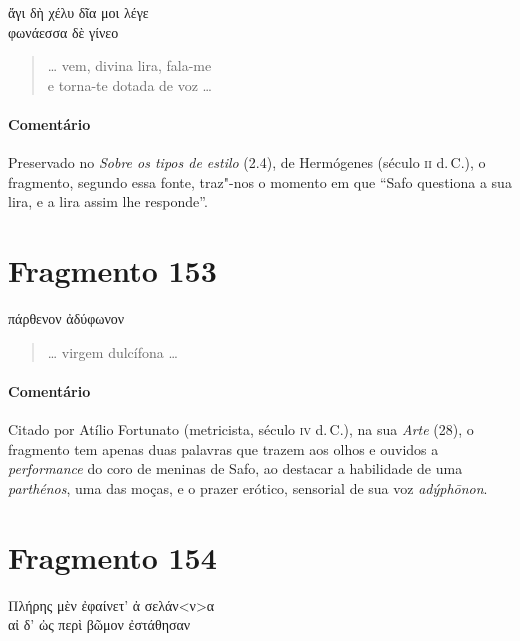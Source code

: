 \begin{gkverse}
ἄγι δὴ χέλυ δῖα \dagger{}μοι λέγε\dagger{}\\
φωνάεσσα \dagger{}δὲ γίνεο\dagger{}
\end{gkverse}

\begin{verse}
\ldots{} vem, divina lira, fala-me\\
e torna-te dotada de voz \ldots{}
\end{verse}

\medskip

{\paragraph{Comentário} Preservado no \emph{Sobre os tipos de estilo} (2.4), de Hermógenes (século \textsc{ii} d.\,C.),
o fragmento, segundo essa fonte, traz"-nos o momento em que ``Safo
questiona a sua lira, e a lira assim lhe responde''.}


\section{Fragmento 153}

\begin{gkverse}
πάρθενον ἀδύφωνον
\end{gkverse}

\begin{verse}
\ldots{} virgem dulcífona \ldots{}
\end{verse}

\medskip

{\paragraph{Comentário} Citado por Atílio Fortunato (metricista, século \textsc{iv} d.\,C.), na sua \emph{Arte} (28), o fragmento tem apenas duas palavras que trazem aos olhos e ouvidos a \emph{performance} do coro de meninas de Safo, ao destacar a habilidade de uma \emph{parthénos}, uma das moças, e o prazer erótico, sensorial de sua voz \emph{adýphōnon}.}

\section{Fragmento 154}

\begin{gkverse}
Πλήρης μὲν ἐφαίνετ’ ἀ σελάν<ν>α\\
αἰ δ’ ὠς περὶ βῶμον ἐστάθησαν
\end{gkverse}

